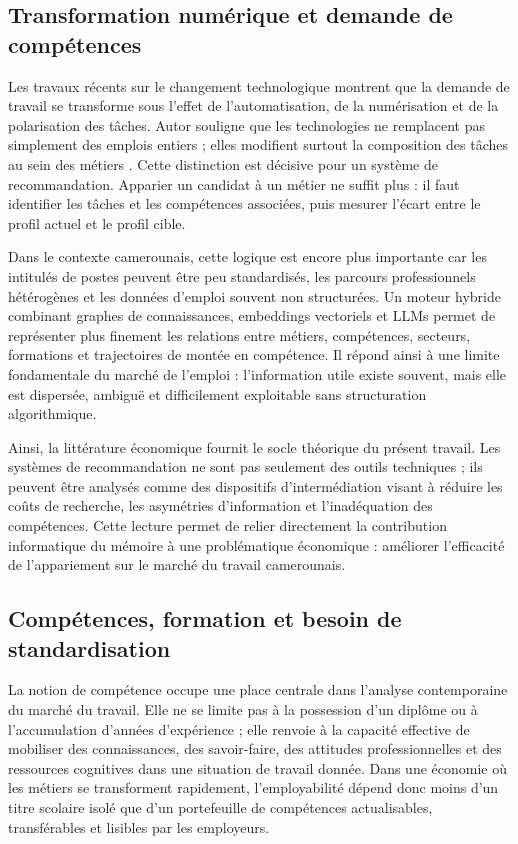 \documentclass[12pt,twoside]{report}
\begin{document}
\subsection{Transformation numérique et demande de compétences}
Les travaux récents sur le changement technologique montrent que la demande de travail se transforme sous l'effet de l'automatisation, de la numérisation et de la polarisation des tâches. Autor souligne que les technologies ne remplacent pas simplement des emplois entiers ; elles modifient surtout la composition des tâches au sein des métiers \cite{autor2013growth}. Cette distinction est décisive pour un système de recommandation. Apparier un candidat à un métier ne suffit plus : il faut identifier les tâches et les compétences associées, puis mesurer l'écart entre le profil actuel et le profil cible.

Dans le contexte camerounais, cette logique est encore plus importante car les intitulés de postes peuvent être peu standardisés, les parcours professionnels hétérogènes et les données d'emploi souvent non structurées. Un moteur hybride combinant graphes de connaissances, embeddings vectoriels et LLMs permet de représenter plus finement les relations entre métiers, compétences, secteurs, formations et trajectoires de montée en compétence. Il répond ainsi à une limite fondamentale du marché de l'emploi : l'information utile existe souvent, mais elle est dispersée, ambiguë et difficilement exploitable sans structuration algorithmique.

Ainsi, la littérature économique fournit le socle théorique du présent travail. Les systèmes de recommandation ne sont pas seulement des outils techniques ; ils peuvent être analysés comme des dispositifs d'intermédiation visant à réduire les coûts de recherche, les asymétries d'information et l'inadéquation des compétences. Cette lecture permet de relier directement la contribution informatique du mémoire à une problématique économique : améliorer l'efficacité de l'appariement sur le marché du travail camerounais.

\subsection{Compétences, formation et besoin de standardisation}
La notion de compétence occupe une place centrale dans l'analyse contemporaine du marché du travail. Elle ne se limite pas à la possession d'un diplôme ou à l'accumulation d'années d'expérience ; elle renvoie à la capacité effective de mobiliser des connaissances, des savoir-faire, des attitudes professionnelles et des ressources cognitives dans une situation de travail donnée. Dans une économie où les métiers se transforment rapidement, l'employabilité dépend donc moins d'un titre scolaire isolé que d'un portefeuille de compétences actualisables, transférables et lisibles par les employeurs.
\end{document}
